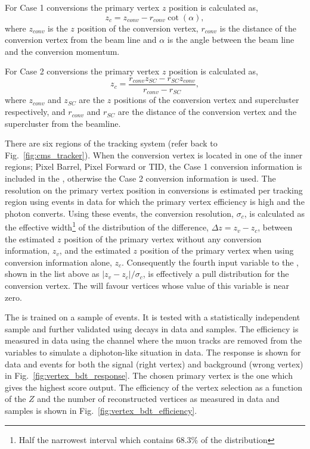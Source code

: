 For Case 1 conversions the primary vertex $z$ position is calculated as,
\begin{equation}
  z_{c} = z_{conv} - r_{conv}\cot(\alpha),
\end{equation}
where $z_{conv}$ is the $z$ position of the conversion vertex, $r_{conv}$ is the distance of the conversion vertex from the beam line and $\alpha$ is the angle between the beam line and the conversion momentum.

For Case 2 conversions the primary vertex $z$ position is calculated as,
\begin{equation}
  z_{c} = \frac{r_{conv}z_{SC} - r_{SC}z_{conv}}{r_{conv} - r_{SC}},
\end{equation}
where $z_{conv}$ and $z_{SC}$ are the $z$ positions of the conversion vertex and supercluster respectively, and $r_{conv}$ and $r_{SC}$ are the distance of the conversion vertex and the supercluster from the beamline.

There are six regions of the tracking system (refer back to Fig.~\ref{fig:cms_tracker}). When the conversion vertex is located in one of the inner regions; Pixel Barrel, Pixel Forward or TID, the Case 1 
conversion information is included in the \BDT, otherwise the Case 2 conversion information is used. The resolution on the primary vertex position in conversions is estimated per tracking region using \gjet events in data for which the primary vertex efficiency is high and the photon converts. Using these events, the conversion resolution, $\sigma_{c}$, is calculated as the effective width\footnote{Half the narrowest interval which contains 68.3\% of the distribution} of the distribution of the difference, $\Delta z=z_{v}-z_{c}$, between the estimated $z$ position of the primary vertex without any conversion information, $z_{v}$, and the estimated $z$ position of the primary vertex when using conversion information alone, $z_{c}$. Consequently the fourth input variable to the \BDT, shown in the list above as $|z_{v}-z_{c}|/\sigma_{c}$, is effectively a pull distribution for the conversion vertex. The \BDT will favour vertices whose value of this variable is near zero.

The \BDT is trained on a sample of \Hgg \MC events. It is tested with a statistically independent sample and further validated using \Zmumu decays in data and \MC samples. The efficiency is measured in data using the \Zmumu channel where the muon tracks are removed from the \BDT variables to simulate a diphoton-like situation in data. The \BDT response is shown for \Zmumu data and \MC events for both the signal (right vertex) and background (wrong vertex) in Fig.~\ref{fig:vertex_bdt_response}. The chosen primary vertex is the one which gives the highest score \BDT output. The efficiency of the vertex selection as a function of the $Z$ \pT and the number of reconstructed vertices as measured in \Zmumu data and \MC samples is shown in Fig.~\ref{fig:vertex_bdt_efficiency}. 

